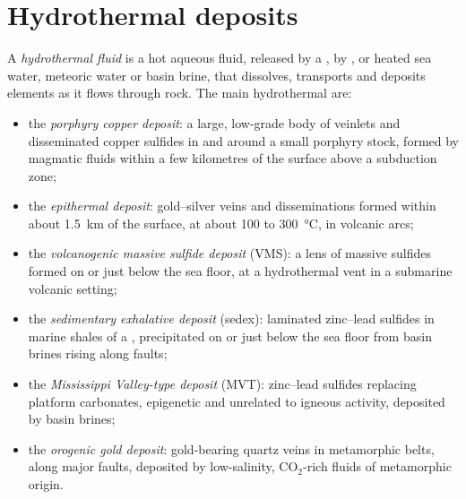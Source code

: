 \section{Hydrothermal deposits}\label{sec:b2:ore-deposits:hydrothermal}

\begin{definition}\label{def:b2:ore-deposits:hydrothermal}
A \emph{hydrothermal fluid} is a hot aqueous fluid, released by a ,
by , or heated sea water, meteoric water or basin brine, that dissolves,
transports and deposits elements as it flows through rock. The main hydrothermal 
are:
\begin{itemize}
  \item the \emph{porphyry copper deposit}: a large, low-grade body
        of veinlets and disseminated copper sulfides in and around a small porphyry stock, formed by
        magmatic fluids within a few kilometres of the surface above a subduction zone;
  \item the \emph{epithermal deposit}: gold--silver veins and
        disseminations formed within about \qty{1.5}{km} of the surface, at about 100 to
        \qty{300}{\celsius}, in volcanic arcs;
  \item the \emph{volcanogenic massive sulfide deposit}
        (VMS): a lens of massive sulfides formed on or just below the sea floor, at a hydrothermal
        vent in a submarine volcanic setting;
  \item the \emph{sedimentary exhalative deposit} (sedex):
        laminated zinc--lead sulfides in marine shales of a , precipitated on or just
        below the sea floor from basin brines rising along faults;
  \item the \emph{Mississippi Valley-type deposit} (MVT):
        zinc--lead sulfides replacing platform carbonates, epigenetic and unrelated to igneous
        activity, deposited by basin brines;
  \item the \emph{orogenic gold deposit}: gold-bearing quartz veins in
        metamorphic belts, along major faults, deposited by low-salinity, CO$_2$-rich fluids of
        metamorphic origin.
\end{itemize}
\end{definition}


